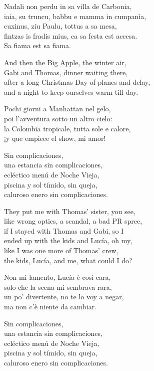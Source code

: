 \begin{lyrics}
Nadali non perdu in sa villa de Carbonia,\\
iaia, su truncu, babbu e mamma in cumpanìa,\\
cuxinus, ziu Paulu, tottus a sa mesa,\\
fintzas is fradis mius, ca sa festa est accesa.\\
Sa fiama est sa fiama.

And then the Big Apple, the winter air,\\
Gabi and Thomas, dinner waiting there,\\
after a long Christmas Day of planes and delay,\\
and a night to keep ourselves warm till day.

Pochi giorni a Manhattan nel gelo,\\
poi l’avventura sotto un altro cielo:\\
la Colombia tropicale, tutta sole e calore,\\
¡y que empiece el show, mi amor!

Sin complicaciones,\\
una estancia sin complicaciones,\\
ecléctico menú de Noche Vieja,\\
piscina y sol tímido, sin queja,\\
caluroso enero sin complicaciones.

They put me with Thomas’ sister, you see,\\
like wrong optics, a scandal, a bad PR spree,\\
if I stayed with Thomas and Gabi, so I\\
ended up with the kids and Lucía, oh my,\\
like I was one more of Thomas’ crew,\\
the kids, Lucía, and me, what could I do?

Non mi lamento, Lucía è così cara,\\
solo che la scena mi sembrava rara,\\
un po’ divertente, no te lo voy a negar,\\
ma non c’è niente da cambiar.

Sin complicaciones,\\
una estancia sin complicaciones,\\
ecléctico menú de Noche Vieja,\\
piscina y sol tímido, sin queja,\\
caluroso enero sin complicaciones.


\end{lyrics}
